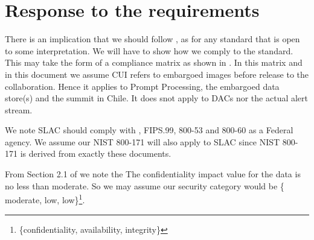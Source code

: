 \section{Response to the requirements}\label{sec:resp}

There is an implication that we should follow , as for any standard that is open to some interpretation.
We will have to show how we comply to the standard.
This may take the form of a compliance matrix as shown in .
In this matrix and in this document we assume CUI refers to embargoed images before release to the collaboration.
Hence it applies to Prompt Processing, the embargoed data store(s) and the summit in Chile. It does snot apply to DACs nor the actual alert stream.

We note SLAC should comply with , FIPS.99, 800-53 and 800-60 as a Federal agency.
We assume our NIST 800-171  will also apply to SLAC since NIST 800-171 is derived from exactly these documents.

From Section 2.1 of  we note the The confidentiality impact value for the data  is no less than moderate.
So we may assume our  security category would be \{ moderate, low, low\}\footnote{\{confidentiality, availability, integrity\}}.









